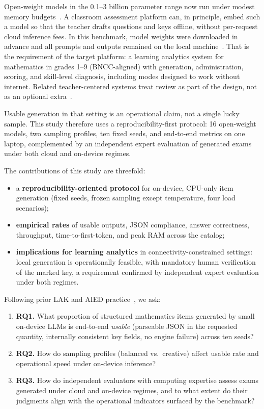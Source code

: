 \documentclass[fleqn,10pt]{JLA_article}
\begin{document}
Open-weight models in the 0.1--3 billion parameter range now run under modest memory budgets~\autocite{minaee2024llms,monteiro2025smalldevice}. A classroom assessment platform can, in principle, embed such a model so that the teacher drafts questions and keys offline, without per-request cloud inference fees. In this benchmark, model weights were downloaded in advance and all prompts and outputs remained on the local machine~\autocite{portela2024gdpr}. That is the requirement of the target platform: a learning analytics system for mathematics in grades 1--9 (BNCC-aligned) with generation, administration, scoring, and skill-level diagnosis, including modes designed to work without internet. Related teacher-centered systems treat review as part of the design, not as an optional extra~\autocite{guerino2025mathaide,rosa2026automated}.

Usable generation in that setting is an operational claim, not a single lucky sample. This study therefore uses a reproducibility-first protocol: 16 open-weight models, two sampling profiles, ten fixed seeds, and end-to-end metrics on one laptop, complemented by an independent expert evaluation of generated exams under both cloud and on-device regimes.

The contributions of this study are threefold:
\begin{itemize}
  \item a \textbf{reproducibility-oriented protocol} for on-device, CPU-only item generation (fixed seeds, frozen sampling except temperature, four load scenarios);
  \item \textbf{empirical rates} of usable outputs, JSON compliance, answer correctness, throughput, time-to-first-token, and peak RAM across the catalog;
  \item \textbf{implications for learning analytics} in connectivity-constrained settings: local generation is operationally feasible, with mandatory human verification of the marked key, a requirement confirmed by independent expert evaluation under both regimes.
\end{itemize}
Following prior LAK and AIED practice~\autocite{rodrigues2025llms,rosa2026automated}, we ask:
\begin{enumerate}
  \item \textbf{RQ1.} What proportion of structured mathematics items generated by small on-device LLMs is end-to-end \emph{usable} (parseable JSON in the requested quantity, internally consistent key fields, no engine failure) across ten seeds?
  \item \textbf{RQ2.} How do sampling profiles (balanced vs.\ creative) affect usable rate and operational speed under on-device inference?
  \item \textbf{RQ3.} How do independent evaluators with computing expertise assess exams generated under cloud and on-device regimes, and to what extent do their judgments align with the operational indicators surfaced by the benchmark?
\end{enumerate}
\end{document}
